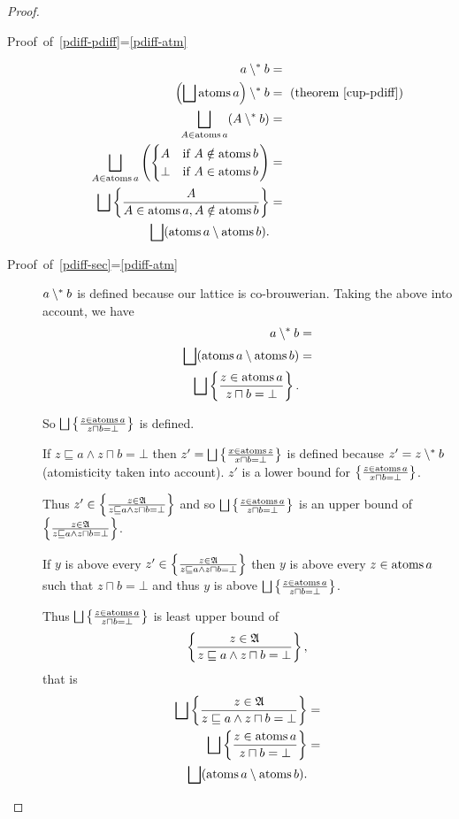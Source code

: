 \begin{proof}
~
\begin{description}
\item [{Proof~of~\ref{pdiff-pdiff}=\ref{pdiff-atm}}] 
\begin{align*}
a\setminus^{\ast} b & =\\
\left(\bigsqcup\operatorname{atoms} a\right)\setminus^{\ast} b & =\text{ (theorem \ref{cup-pdiff})}\\
\bigsqcup_{A\in\operatorname{atoms} a}(A\setminus^{\ast} b) & =\\
\bigsqcup_{A\in\operatorname{atoms} a}\left(\begin{cases}
A & \text{if }A\notin\operatorname{atoms} b\\
\bot & \text{if }A\in\operatorname{atoms} b
\end{cases}\right) & =\\
\bigsqcup\left\{ \frac{A}{A\in\operatorname{atoms} a,A\notin\operatorname{atoms} b}\right\} & =\\
\bigsqcup(\operatorname{atoms} a\setminus\operatorname{atoms} b).
\end{align*}

\item [{Proof~of~\ref{pdiff-sec}=\ref{pdiff-atm}}] $a\setminus^{\ast} b$
is defined because our lattice is co-brouwerian. Taking the above
into account, we have
\begin{align*}
a\setminus^{\ast} b & =\\
\bigsqcup(\operatorname{atoms} a\setminus\operatorname{atoms} b) & =\\
\bigsqcup\left\{ \frac{z\in\operatorname{atoms} a}{z\sqcap b=\bot}\right\}.
\end{align*}



So $\bigsqcup\left\{ \frac{z\in\operatorname{atoms} a}{z\sqcap b=\bot}\right\}$ is defined.


If $z\sqsubseteq a\land z\sqcap b=\bot$ then $z'=\bigsqcup\left\{ \frac{x\in\operatorname{atoms} z}{x\sqcap b=\bot}\right\}$
is defined because $z'=z\setminus^{\ast} b$ (atomisticity taken into account).
$z'$ is a lower bound for $\left\{ \frac{z\in\operatorname{atoms} a}{x\sqcap b=\bot}\right\}$.


Thus $z'\in\left\{ \frac{z\in\mathfrak{A}}{z\sqsubseteq a\land z\sqcap b=\bot}\right\}$
and so $\bigsqcup\left\{ \frac{z\in\operatorname{atoms} a}{z\sqcap b=\bot}\right\}$ is an upper
bound of $\left\{ \frac{z\in\mathfrak{A}}{z\sqsubseteq a\land z\sqcap b=\bot}\right\}$.


If $y$ is above every $z'\in\left\{ \frac{z\in\mathfrak{A}}{z\sqsubseteq a\land z\sqcap b=\bot}\right\}$
then $y$ is above every $z\in\operatorname{atoms} a$ such that $z\sqcap b=\bot$
and thus $y$ is above $\bigsqcup\left\{ \frac{z\in\operatorname{atoms} a}{z\sqcap b=\bot}\right\}$.


Thus $\bigsqcup\left\{ \frac{z\in\operatorname{atoms} a}{z\sqcap b=\bot}\right\}$ is least upper
bound of
\[
\left\{ \frac{z\in\mathfrak{A}}{z\sqsubseteq a\land z\sqcap b=\bot}\right\},
\]
that is
\begin{align*}
\bigsqcup\left\{ \frac{z\in\mathfrak{A}}{z\sqsubseteq a\land z\sqcap b=\bot}\right\} & =\\
\bigsqcup\left\{ \frac{z\in\operatorname{atoms} a}{z\sqcap b=\bot}\right\} & =\\
\bigsqcup(\operatorname{atoms} a\setminus\operatorname{atoms} b).
\end{align*}


\end{description}
\end{proof}

